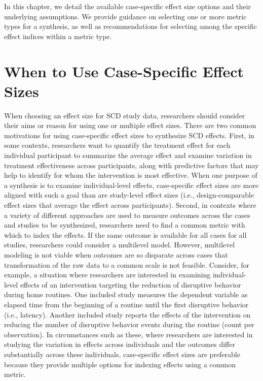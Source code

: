 \documentclass[
]{book}
\begin{document}
In this chapter, we detail the available case-specific effect size options and their underlying assumptions. We provide guidance on selecting one or more metric types for a synthesis, as well as recommendations for selecting among the specific effect indices within a metric type.

\hypertarget{when-to-use-case-specific-effect-sizes}{%
\section{When to Use Case-Specific Effect Sizes}\label{when-to-use-case-specific-effect-sizes}}

When choosing an effect size for SCD study data, researchers should consider their aims or reason for using one or multiple effect sizes. There are two common motivations for using case-specific effect sizes to synthesize SCD effects. First, in some contexts, researchers want to quantify the treatment effect for each individual participant to summarize the average effect and examine variation in treatment effectiveness across participants, along with predictive factors that may help to identify for whom the intervention is most effective. When one purpose of a synthesis is to examine individual-level effects, case-specific effect sizes are more aligned with such a goal than are study-level effect sizes (i.e., design-comparable effect sizes that average the effect across participants). Second, in contexts where a variety of different approaches are used to measure outcomes across the cases and studies to be synthesized, researchers need to find a common metric with which to index the effects. If the same outcome is available for all cases for all studies, researchers could consider a multilevel model. However, multilevel modeling is not viable when outcomes are so disparate across cases that transformation of the raw data to a common scale is not feasible. Consider, for example, a situation where researchers are interested in examining individual-level effects of an intervention targeting the reduction of disruptive behavior during home routines. One included study measures the dependent variable as elapsed time from the beginning of a routine until the first disruptive behavior (i.e., latency). Another included study reports the effects of the intervention on reducing the number of disruptive behavior events during the routine (count per observation). In circumstances such as these, where researchers are interested in studying the variation in effects across individuals and the outcomes differ substantially across these individuals, case-specific effect sizes are preferable because they provide multiple options for indexing effects using a common metric.
\end{document}
